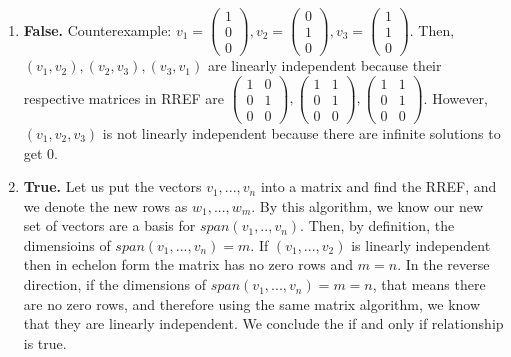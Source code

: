 \documentclass{article}
\begin{document}
\begin{enumerate}
\begin{enumerate}
\item \textbf{False.} Counterexample: $v_1 = \left(\begin{array}{c} 1 \\ 0 \\ 0 \end{array}\right), v_2 = \left(\begin{array}{c} 0 \\ 1 \\ 0 \end{array}\right), v_3 = \left(\begin{array}{c} 1 \\ 1 \\ 0 \end{array}\right)$. Then, \\ $(v_1,v_2), (v_2, v_3), (v_3, v_1)$ are linearly independent because their respective matrices in RREF are $ \left(\begin{array}{cc} 1 & 0 \\ 0 & 1 \\ 0 & 0 \end{array}\right), \left(\begin{array}{cc} 1 & 1 \\ 0 & 1 \\ 0 & 0 \end{array}\right), \left(\begin{array}{cc} 1 & 1 \\ 0 & 1 \\ 0 & 0 \end{array}\right)$. However, $(v_1,v_2,v_3)$ is not linearly independent because there are infinite solutions to get 0.

\item \textbf{True.} Let us put the vectors $v_1,...,v_n$ into a matrix and find the RREF, and we denote the new rows as $w_1,...,w_m$. By this algorithm, we know our new set of vectors are a basis for $span(v_1,..,v_n)$. Then, by definition, the dimensioins of $span(v_1,...,v_n) = m$. If $(v_1,...,v_2)$ is linearly independent then in echelon form the matrix has no zero rows and $m = n$. In the reverse direction, if the dimensions of $span(v_1,...,v_n) = m = n$, that means there are no zero rows, and therefore using the same matrix algorithm, we know that they are linearly independent. We conclude the if and only if relationship is true.


\end{enumerate}
\end{enumerate}
\end{document}
